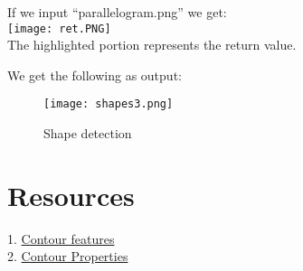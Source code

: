 \documentclass[]{article}
\begin{document}
If we input ``parallelogram.png'' we get:\\
\texttt{[image: ret.PNG]}\\
The highlighted portion represents the return value.

We get the following as output:\\
\begin{figure}
	\centering
	\texttt{[image: shapes3.png]}
	\caption{Shape detection}
\end{figure}

\section{Resources}\label{resources}

1. \href{http://opencv-python-tutroals.readthedocs.org/en/latest/py \\
\_tutorials/py\_imgproc/py\_contours/py\_contour\_features/py\\
\_contour\_features.html\#contour-features}{Contour features}\\
2. \href{http://docs.opencv.org/modules/imgproc/doc/structural\_analysis \\
\_and\_shape\_descriptors.html?highlight=findcontours\#arclength}{Contour Properties}
\end{document}

